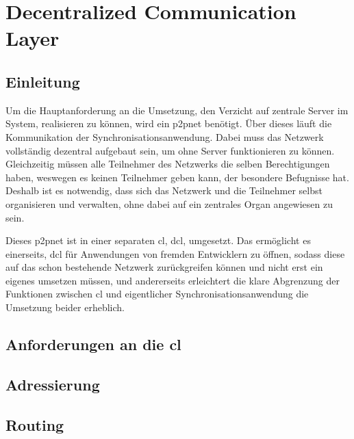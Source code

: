\chapter{Decentralized Communication Layer}
\renewcommand{\kapitelautor}{Autor: Martin Exner}

\section{Einleitung}
Um die Hauptanforderung an die Umsetzung, den Verzicht auf zentrale Server im System, realisieren zu können,
wird ein \gls{p2pnet} benötigt. Über dieses läuft die Kommunikation der Synchronisationsanwendung.
Dabei muss das Netzwerk vollständig dezentral aufgebaut sein, um ohne Server funktionieren zu können.
Gleichzeitig müssen alle Teilnehmer des Netzwerks die selben Berechtigungen haben, weswegen es keinen
Teilnehmer geben kann, der besondere Befugnisse hat. Deshalb ist es notwendig, dass sich das Netzwerk
und die Teilnehmer selbst organisieren und verwalten, ohne dabei auf ein zentrales Organ angewiesen
zu sein.

Dieses \gls{p2pnet} ist in einer separaten \gls{cl}, \gls{dcl}, umgesetzt.
Das ermöglicht es einerseits, \gls{dcl} für Anwendungen von fremden Entwicklern zu öffnen, sodass diese auf das schon bestehende Netzwerk
zurückgreifen können und nicht erst ein eigenes umsetzen müssen, und andererseits erleichtert die klare Abgrenzung der Funktionen
zwischen \gls{cl} und eigentlicher Synchronisationsanwendung die Umsetzung beider erheblich.

\section{Anforderungen an die \gls{cl}}


\section{Adressierung}


\section{Routing}


